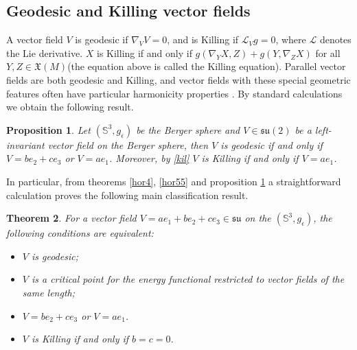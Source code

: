 \documentclass[11pt,oneside,leqno]{amsart}
\theoremstyle{plain}
\newtheorem{theorem}{Theorem}[section]
\newtheorem{prop}[theorem]{Proposition}
\begin{document}
\subsection{Geodesic and Killing vector fields}
A vector field $V$ is geodesic if $\nabla_VV =0$, and is Killing if $\mathcal{L}_V g=0$, where $\mathcal{L}$ denotes
the Lie derivative. $X$ is Killing if and only if  $g(\nabla_Y X,Z) + g(Y,\nabla_ZX)$ for all $Y,Z \in
\mathfrak{X}(M)$(the equation above is called the Killing equation).
 Parallel vector fields are both geodesic and Killing, and vector fields with these special geometric features often have particular harmonicity properties \cite{a2,g11,g2,h1}.
By standard calculations we obtain the following result.
\begin{prop} \label{pro11} 
Let $({{\mathbb S}}^3, g_{\epsilon})$ be the Berger sphere and  $V\in {{\mathfrak{su}}}(2)$ be a left-invariant vector field on the Berger sphere, then $V$ is geodesic if and only if $V=be_2+ce_3$ or $V=ae_1$. Moreover, by \eqref{kil} $V$ is Killing if and only if $V=ae_1$.
\end{prop}
In particular, from theorems \ref{hor4}, \ref{hor55} and proposition \ref{pro11} 
a straightforward calculation proves the following main classification result.
\begin{theorem}\label{hor6}
For a vector field $V=ae_1+be_2+ce_3\in {{\mathfrak{su}}}$ on the $({{\mathbb S}}^3, g_{\epsilon})$, the
following conditions are equivalent:
 \begin{itemize}
\item[$(1)$] $V$ is geodesic;
\item[$(2)$] $V$ is a critical point for the energy functional restricted to vector fields of the same length;
\item[$(3)$] $V=be_2+ce_3$ or $V=ae_1$.
\item[$(4)$] $V$ is Killing if and only if $b=c=0$.
\end{itemize}
\end{theorem}
\end{document}
